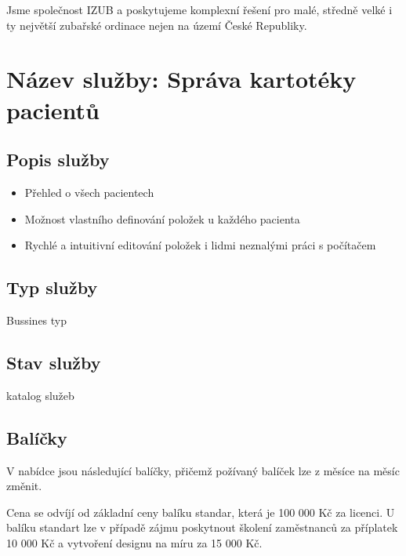 \documentclass[12pt, a4paper, titlepage]{article}
\begin{document}
	\vspace{1em}

	\noindent Jsme společnost IZUB a poskytujeme komplexní řešení pro malé, středně velké i ty největší zubařské ordinace nejen na území České Republiky.
	\vspace{1em}

	\noindent\makebox[\linewidth]{\rule{16cm}{0.4pt}}

	\vspace{2em}

	\section*{Název služby: Správa kartotéky pacientů}
	\vspace{1em}

	\subsection*{Popis služby}
	\begin{itemize}
		\item Přehled o všech pacientech
		\item Možnost vlastního definování položek u každého pacienta
		\item Rychlé a intuitivní editování položek i lidmi neznalými práci s počítačem
	\end{itemize}

	\subsection*{Typ služby}

	Bussines typ

	\subsection*{Stav služby}

	katalog služeb

	\subsection*{Balíčky}
	V nabídce jsou následující balíčky, přičemž požívaný balíček lze z měsíce na měsíc změnit.

	Cena se odvíjí od základní ceny balíku standar, která je 100 000 Kč za licenci. U balíku standart lze v případě zájmu poskytnout školení zaměstnanců za příplatek 10 000 Kč a vytvoření designu na míru za 15 000 Kč.
\end{document}

